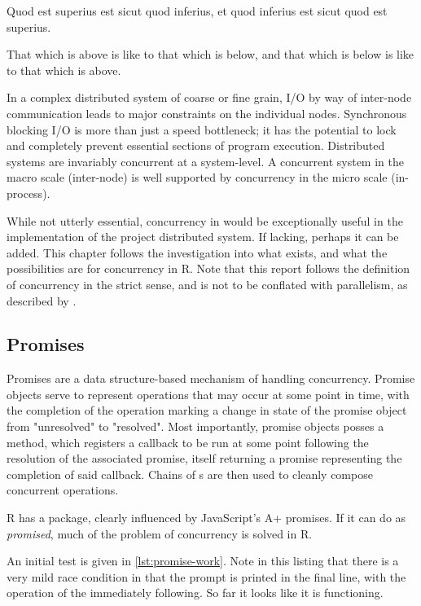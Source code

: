 \begin{displayquote}
Quod est superius est sicut quod inferius, et quod inferius est sicut quod est superius.

That which is above is like to that which is below, and that which is below is like to that which is above.
\end{displayquote}

In a complex distributed system of coarse or fine grain, I/O by way of inter-node communication leads to major constraints on the individual nodes.
Synchronous blocking I/O is more than just a speed bottleneck; it has the potential to lock and completely prevent essential sections of program execution.
Distributed systems are invariably concurrent at a system-level.
A concurrent system in the macro scale (inter-node) is well supported by concurrency in the micro scale (in-process).

While not utterly essential, concurrency in \R would be exceptionally useful in the implementation of the project distributed system.
If lacking, perhaps it can be added.
This chapter follows the investigation into what exists, and what the possibilities are for concurrency in R.
Note that this report follows the definition of concurrency in the strict sense, and is not to be conflated with parallelism, as described by \textcite{pike2012concurrency}.

\subsection{Promises}

Promises are a data structure-based mechanism of handling concurrency\cite{liskov1988promises}.
Promise objects serve to represent operations that may occur at some point in time, with the completion of the operation marking a change in state of the promise object from "unresolved" to "resolved".
Most importantly, promise objects posses a  method, which registers a callback to be run at some point following the resolution of the associated promise, itself returning a promise representing the completion of said callback.
Chains of s are then used to cleanly compose concurrent operations.

R has a  package, clearly influenced by JavaScript's A+ promises\cite{cheng2021promises}.
If it can do as \textit{promised}, much of the problem of concurrency is solved in R.

An initial test is given in \cref{lst:promise-work}.
Note in this listing that there is a very mild race condition in that the prompt is printed in the final line, with the operation of the  immediately following.
So far it looks like it is functioning.

